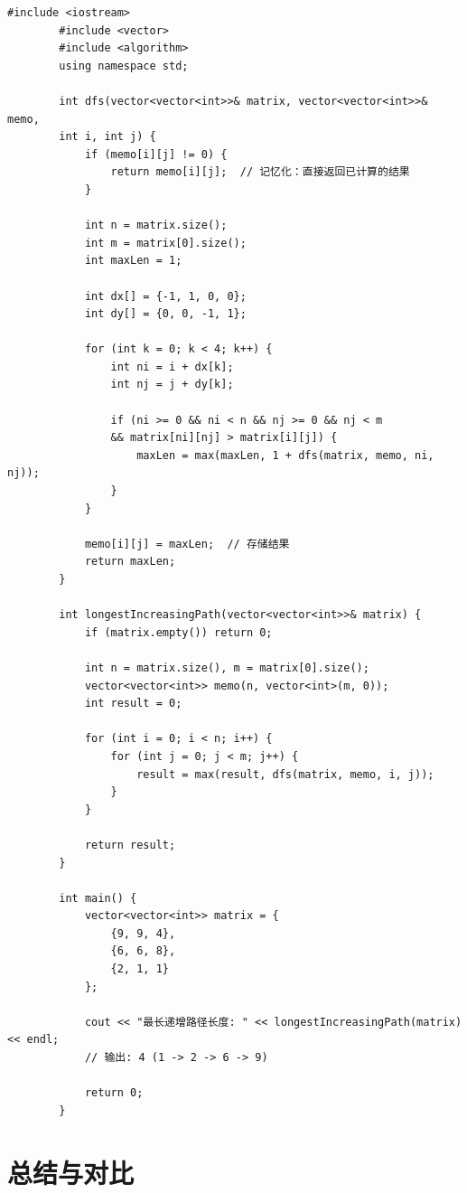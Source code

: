 \documentclass[12pt,a4paper]{article}
\begin{document}
	\begin{lstlisting}[caption={记忆化搜索示例：最长递增路径}]
		#include <iostream>
		#include <vector>
		#include <algorithm>
		using namespace std;
		
		int dfs(vector<vector<int>>& matrix, vector<vector<int>>& memo, 
		int i, int j) {
			if (memo[i][j] != 0) {
				return memo[i][j];  // 记忆化：直接返回已计算的结果
			}
			
			int n = matrix.size();
			int m = matrix[0].size();
			int maxLen = 1;
			
			int dx[] = {-1, 1, 0, 0};
			int dy[] = {0, 0, -1, 1};
			
			for (int k = 0; k < 4; k++) {
				int ni = i + dx[k];
				int nj = j + dy[k];
				
				if (ni >= 0 && ni < n && nj >= 0 && nj < m 
				&& matrix[ni][nj] > matrix[i][j]) {
					maxLen = max(maxLen, 1 + dfs(matrix, memo, ni, nj));
				}
			}
			
			memo[i][j] = maxLen;  // 存储结果
			return maxLen;
		}
		
		int longestIncreasingPath(vector<vector<int>>& matrix) {
			if (matrix.empty()) return 0;
			
			int n = matrix.size(), m = matrix[0].size();
			vector<vector<int>> memo(n, vector<int>(m, 0));
			int result = 0;
			
			for (int i = 0; i < n; i++) {
				for (int j = 0; j < m; j++) {
					result = max(result, dfs(matrix, memo, i, j));
				}
			}
			
			return result;
		}
		
		int main() {
			vector<vector<int>> matrix = {
				{9, 9, 4},
				{6, 6, 8},
				{2, 1, 1}
			};
			
			cout << "最长递增路径长度: " << longestIncreasingPath(matrix) << endl;
			// 输出: 4 (1 -> 2 -> 6 -> 9)
			
			return 0;
		}
	\end{lstlisting}
	
	\section{总结与对比}
	
\end{document}
